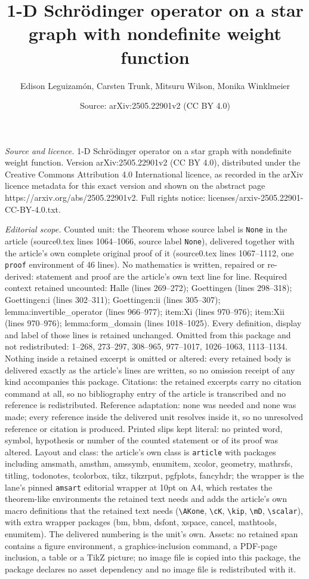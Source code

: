 \documentclass[10pt,a4paper]{amsart}
\title[1-D Schr\"odinger operator on a star graph with nondefinite ]{1-D Schr\"odinger operator on a star graph with nondefinite weight function}
\author{Edison Leguizam\'on, Carsten Trunk, Mitsuru Wilson, Monika Winklmeier}
\date{Source: arXiv:2505.22901v2 (CC BY 4.0)}
\begin{document}
\maketitle

\noindent\emph{Source and licence.} 1-D Schr\"odinger operator on a star graph with nondefinite weight function. Version arXiv:2505.22901v2 (CC BY 4.0), distributed under the Creative Commons Attribution 4.0 International licence, as recorded in the arXiv licence metadata for this exact version and shown on the abstract page https://arxiv.org/abs/2505.22901v2. Full rights notice: licenses/arxiv-2505.22901-CC-BY-4.0.txt.\par\smallskip

\noindent\textit{Editorial scope.} Counted unit: the Theorem whose source label is \texttt{None} in the article (source0.tex lines 1064--1066, source label \texttt{None}), delivered together with the article's own complete original proof of it (source0.tex lines 1067--1112, one \texttt{proof} environment of 46 lines). No mathematics is written, repaired or re-derived: statement and proof are the article's own text line for line. Required context retained uncounted: Halle (lines 269--272); Goettingen (lines 298--318); Goettingen:i (lines 302--311); Goettingen:ii (lines 305--307); lemma:invertible\_operator (lines 966--977); item:Xi (lines 970--976); item:Xii (lines 970--976); lemma:form\_domain (lines 1018--1025). Every definition, display and label of those lines is retained unchanged. Omitted from this package and not redistributed: 1--268, 273--297, 308--965, 977--1017, 1026--1063, 1113--1134. Nothing inside a retained excerpt is omitted or altered: every retained body is delivered exactly as the article's lines are written, so no omission receipt of any kind accompanies this package. Citations: the retained excerpts carry no citation command at all, so no bibliography entry of the article is transcribed and no reference is redistributed. Reference adaptation: none was needed and none was made; every reference inside the delivered unit resolves inside it, so no unresolved reference or citation is produced. Printed slips kept literal: no printed word, symbol, hypothesis or number of the counted statement or of its proof was altered. Layout and class: the article's own class is \texttt{article} with packages including amsmath, amsthm, amssymb, enumitem, xcolor, geometry, mathrsfs, titling, todonotes, tcolorbox, tikz, tikzrput, pgfplots, fancyhdr; the wrapper is the lane's pinned \texttt{amsart} editorial wrapper at 10pt on A4, which restates the theorem-like environments the retained text needs and adds the article's own macro definitions that the retained text needs (\texttt{\textbackslash AKone}, \texttt{\textbackslash cK}, \texttt{\textbackslash kip}, \texttt{\textbackslash mD}, \texttt{\textbackslash scalar}), with extra wrapper packages (bm, bbm, dsfont, xspace, cancel, mathtools, enumitem). The delivered numbering is the unit's own. Assets: no retained span contains a figure environment, a graphics-inclusion command, a PDF-page inclusion, a table or a TikZ picture; no image file is copied into this package, the package declares no asset dependency and no image file is redistributed with it. 
\end{document}
